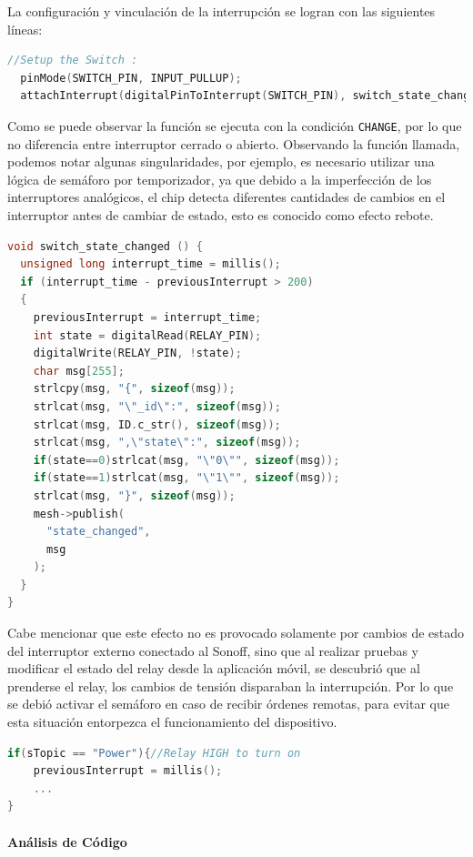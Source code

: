 La configuración y vinculación de la interrupción se logran con las siguientes líneas:

\begin{lstlisting}[language=C]
  //Setup the Switch :
  pinMode(SWITCH_PIN, INPUT_PULLUP);
  attachInterrupt(digitalPinToInterrupt(SWITCH_PIN), switch_state_changed, CHANGE);
\end{lstlisting}

Como se puede observar la función se ejecuta con la condición \lstinline[columns=fixed]{CHANGE}, por lo que no diferencia entre interruptor cerrado o abierto.
Observando la función llamada, podemos notar algunas singularidades, por ejemplo, es necesario utilizar una lógica de semáforo por temporizador, ya que debido a la imperfección de los interruptores analógicos, el chip detecta diferentes cantidades de cambios en el interruptor antes de cambiar de estado, esto es conocido como efecto rebote.

\begin{lstlisting}[language=C]
void switch_state_changed () {
  unsigned long interrupt_time = millis();
  if (interrupt_time - previousInterrupt > 200)
  {
    previousInterrupt = interrupt_time;
    int state = digitalRead(RELAY_PIN);
    digitalWrite(RELAY_PIN, !state);
    char msg[255];
    strlcpy(msg, "{", sizeof(msg));
    strlcat(msg, "\"_id\":", sizeof(msg));
    strlcat(msg, ID.c_str(), sizeof(msg));
    strlcat(msg, ",\"state\":", sizeof(msg));
    if(state==0)strlcat(msg, "\"0\"", sizeof(msg));
    if(state==1)strlcat(msg, "\"1\"", sizeof(msg));
    strlcat(msg, "}", sizeof(msg));
    mesh->publish(
      "state_changed",
      msg
    );
  }
}
\end{lstlisting}


Cabe mencionar que este efecto no es provocado solamente por cambios de estado del interruptor externo conectado al Sonoff, sino que al realizar pruebas y modificar el estado del relay desde la aplicación móvil, se descubrió que al prenderse el relay, los cambios de tensión disparaban la interrupción. Por lo que se debió activar el semáforo en caso de recibir órdenes remotas, para evitar que esta situación entorpezca el funcionamiento del dispositivo.

\begin{lstlisting}[language=C]
if(sTopic == "Power"){//Relay HIGH to turn on
    previousInterrupt = millis();
    ...
}
\end{lstlisting}


\paragraph{Análisis de Código}

